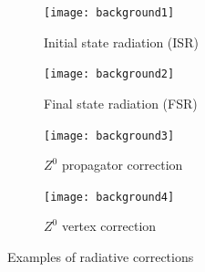 \begin{figure}[H]
\centering
\begin{subfigure}{0.45\textwidth}
    \texttt{[image: background1]}
    \caption{Initial state radiation (ISR)}
\end{subfigure}
\begin{subfigure}{0.45\textwidth}
    \texttt{[image: background2]}
    \caption{Final state radiation (FSR)}
\end{subfigure}
\begin{subfigure}{0.45\textwidth}
    \texttt{[image: background3]}
    \caption{$Z^{0}$ propagator correction}
\end{subfigure}
\begin{subfigure}{0.45\textwidth}
    \texttt{[image: background4]}
    \caption{$Z^{0}$ vertex correction}
\end{subfigure}       
\caption[Examples of radiative corrections]{Examples of radiative corrections \cite{UB}}
\label{fig:backfig}
\end{figure}

